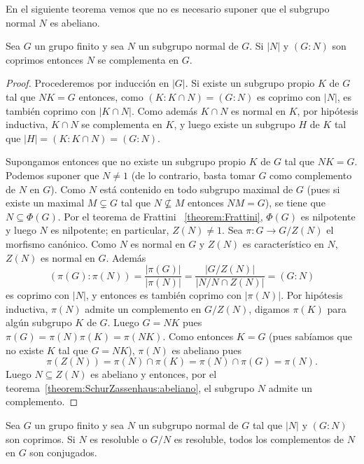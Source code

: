 En el siguiente teorema vemos que no es necesario suponer que el subgrupo
normal $N$ es abeliano.

\begin{theorem}
	\label{theorem:SchurZassenhaus}
	Sea $G$ un grupo finito y sea $N$ un subgrupo normal de $G$. Si $|N|$ y
	$(G:N)$ son coprimos entonces $N$ se complementa en $G$.
\end{theorem}

\begin{proof}
	Procederemos por inducción en $|G|$. Si existe un subgrupo propio $K$ de
	$G$ tal que $NK=G$ entonces, como $(K:K\cap N)=(G:N)$ es coprimo con $|N|$,
	es también coprimo con $|K\cap N|$. Como además $K\cap N$ es normal en $K$,
	por hipótesis inductiva, $K\cap N$ se complementa en $K$, y luego existe un
	subgrupo $H$ de $K$ tal que $|H|=(K:K\cap N)=(G:N)$. 
	
	Supongamos entonces que no existe un subgrupo propio $K$ de $G$ tal que
	$NK=G$.  Podemos suponer que $N\ne1$ (de lo contrario, basta tomar $G$ como
	complemento de $N$ en $G$).  Como $N$ está contenido en todo subgrupo
	maximal de $G$ (pues si existe un maximal $M\subsetneq G$ tal que
	$N\not\subseteq M$ entonces $NM=G$), se tiene que $N\subseteq\Phi(G)$. Por
	el teorema de Frattini ~\ref{theorem:Frattini}, $\Phi(G)$ es nilpotente y
	luego $N$ es nilpotente; en particular, $Z(N)\ne1$. Sea $\pi\colon G\to
	G/Z(N)$ el morfismo canónico. Como $N$ es normal en $G$ y $Z(N)$ es
	característico en $N$, $Z(N)$ es normal en $G$.  Además 
	\[
	(\pi(G):\pi(N))=\frac{|\pi(G)|}{|\pi(N)|}=\frac{|G/Z(N)|}{|N/N\cap Z(N)|}=(G:N)
	\]
	es coprimo con $|N|$, y entonces es también coprimo con $|\pi(N)|$. Por hipótesis
	inductiva, $\pi(N)$ admite un complemento en $G/Z(N)$, digamos $\pi(K)$
	para algún subgrupo $K$ de $G$. Luego $G=NK$ pues 
	$\pi(G)=\pi(N)\pi(K)=\pi(NK)$. 
	Como entonces $K=G$ (pues sabíamos que no existe $K$ tal que $G=NK$), 
	$\pi(N)$ es abeliano pues 
	\[
		\pi(Z(N))=\pi(N)\cap\pi(K)=\pi(N)\cap\pi(G)=\pi(N).
	\]
	Luego $N\subseteq Z(N)$ es abeliano y entonces, por el
	teorema~\ref{theorem:SchurZassenhaus:abeliano}, el subgrupo $N$ admite un
	complemento. 
\end{proof}

\begin{theorem}
	\label{theorem:SchurZassenhaus:conjugacion}
	Sea $G$ un grupo finito y sea $N$ un subgrupo normal de $G$ tal que $|N|$ y
	$(G:N)$ son coprimos. Si $N$ es resoluble o $G/N$ es resoluble, todos los
	complementos de $N$ en $G$ son conjugados.
\end{theorem}

